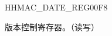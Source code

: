 \begin{register}{H}{HMAC\_DATE\_REG}{\hexprefix{}00F8}\label{regdesc:HMACDATEREG}
%
%
\regnewline%
\begin{regdesc}\begin{reglist}
\label{fielddesc:HMACDATE}\item [HMAC\_DATE] 版本控制寄存器。（读写）
\end{reglist}\end{regdesc}
\end{register}


